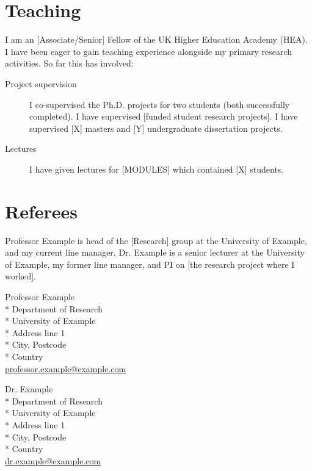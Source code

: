 \documentclass[a4paper,11pt,oneside]{article}
\newcommand{\email}[1]{\href{mailto:#1}{#1}}
\begin{document}
    \section*{Teaching}
    I am an [Associate/Senior] Fellow of the UK Higher Education Academy (HEA).
    I have been eager to gain teaching experience alongside my primary research activities.
    So far this has involved:
    \begin{description}
        \item[Project supervision] I co-supervised the Ph.D. projects for two students (both successfully completed).
        I have supervised [funded student research projects].
        I have supervised [X] masters and [Y] undergraduate dissertation projects.
        \item[Lectures] I have given lectures for [MODULES] which contained [X] students.
    \end{description}

    \section*{Referees}
    Professor Example is head of the [Research] group at the University of Example, and my current line manager.
    Dr. Example is a senior lecturer at the University of Example, my former line manager, and PI on [the research project where I worked].\\[1em]

    \begin{minipage}{0.5\textwidth}
        Professor Example\\*
        Department of Research\\*
        University of Example\\*
        Address line 1\\*
        City, Postcode\\*
        Country\\

        \email{professor.example@example.com}
    \end{minipage}
    \begin{minipage}{0.5\textwidth}
      Dr. Example\\*
      Department of Research\\*
      University of Example\\*
      Address line 1\\*
      City, Postcode\\*
      Country\\

      \email{dr.example@example.com}
    \end{minipage}
\end{document}
